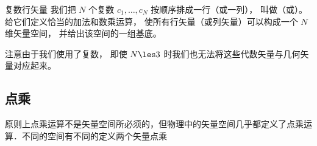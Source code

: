 \begin{exer}{复数行矢量}
我们把 $N$ 个复数 $c_1, \dots, c_N$ 按顺序排成一行（或一列）， 叫做（或）。 给它们定义恰当的加法和数乘运算， 使所有行矢量（或列矢量）可以构成一个 $N$ 维矢量空间， 并给出该空间的一组基底。

注意由于我们使用了复数， 即使 $N \les 3$ 时我们也无法将这些代数矢量与几何矢量对应起来。
\end{exer}

\subsection{点乘}
原则上点乘运算不是矢量空间所必须的，但物理中的矢量空间几乎都定义了点乘运算．不同的空间有不同的定义两个矢量点乘

